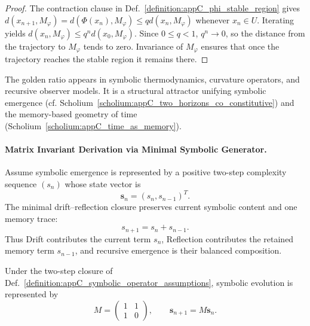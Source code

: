 \begin{proof}
\label{proof:appC_geodesic_convergence}
The contraction clause in Def.~\ref{definition:appC_phi_stable_region} gives
$d(x_{n+1},M_\varphi)=d(\Phi(x_n),M_\varphi)\le qd(x_n,M_\varphi)$ whenever
$x_n\in U$. Iterating yields
$d(x_n,M_\varphi)\le q^n d(x_0,M_\varphi)$. Since $0\le q<1$, $q^n\to0$, so the
distance from the trajectory to $M_\varphi$ tends to zero. Invariance of
$M_\varphi$ ensures that once the trajectory reaches the stable region it remains
there.
\end{proof}

\begin{scholium}
\label{scholium:appC_symbolic_geometric_equivalence}
The golden ratio appears in symbolic thermodynamics, curvature operators, and recursive observer models. It is a structural attractor unifying symbolic emergence (cf. Scholium~\ref{scholium:appC_two_horizons_co_constitutive}) and the memory-based geometry of time (Scholium~\ref{scholium:appC_time_as_memory}).
\end{scholium}

\paragraph{Matrix Invariant Derivation via Minimal Symbolic Generator.}
\label{paragraph:appC_matrix_invariant_derivation_phi}

\begin{definition}
\label{definition:appC_symbolic_operator_assumptions}
Assume symbolic emergence is represented by a positive two-step complexity
sequence $(s_n)$ whose state vector is
\[
\mathbf{s}_n=(s_n,s_{n-1})^T.
\]
The minimal drift--reflection closure preserves current symbolic content and one
memory trace:
\[
s_{n+1}=s_n+s_{n-1}.
\]
Thus Drift contributes the current term $s_n$, Reflection contributes the retained
memory term $s_{n-1}$, and recursive emergence is their balanced composition.
\end{definition}

\begin{lemma}
\label{lemma:appC_matrix_representation_symbolic_operators}
Under the two-step closure of
Def.~\ref{definition:appC_symbolic_operator_assumptions}, symbolic evolution is
represented by
\[
M=\begin{pmatrix}1&1\\1&0\end{pmatrix},
\qquad
\mathbf{s}_{n+1}=M\mathbf{s}_n.
\]
\end{lemma}

